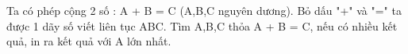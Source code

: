Ta có phép cộng 2 số : A + B = C (A,B,C nguyên dương). Bỏ dấu "+" và "=" ta được 1 dãy số viết liên tục ABC. Tìm A,B,C thỏa A + B = C, nếu có nhiều kết quả, in ra kết quả với A lớn nhất.